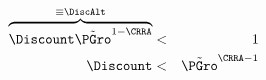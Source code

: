 \begin{eqnarray}
\overbrace{\Discount \tilde{\PGro}^{1-\CRRA} }^{\equiv \DiscAlt} & < & 1 \label{eq:FVR}
\\ \Discount & < & \tilde{\PGro}^{\CRRA-1}  
\end{eqnarray}

